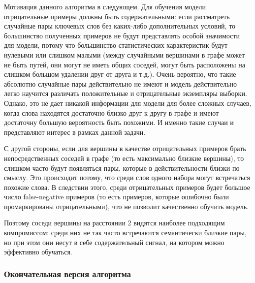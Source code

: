 Мотивация данного алгоритма в следующем. Для обучения модели отрицательные примеры должны быть содержательными: если рассматреть случайные пары ключевых слов без каких-либо дополнительных условий, то большинство полученных примеров не будут представлять особой значимости для модели, потому что большинство статистических характеристик будут нулевыми или слишком малыми (между случайными вершинами в графе может не быть путей, они могут не иметь общих соседей, могут быть расположены на слишком большом удалении друг от друга и т.д.). Очень вероятно, что такие абсолютно случайные пары действительно не имеют и модель действительно легко научится различать положительные и отрицательные экземпляры выборки. Однако,  это не дает никакой информации для модели для более сложных случаев, когда слова находятся достаточно близко друг к другу в графе и имеют достаточну большую вероятность быть похожими. И именно такие случаи и представляют интерес в рамках данной задачи.

С другой стороны, если для вершины в качестве отрицательных примеров брать непосредственных соседей в графе (то есть максимально близкие вершины), то слишком часто будут появляться пары, которые в действительности близки по смыслу. Это происходит потому, что среди слов одного набора могут встречаться похожие слова. В следствии этого, среди отрицательных примеров будет большое число false-negative примеров (то есть примеров, которые ошибочно были промаркированы отрицательными), что не позволит качественно обучить модель.

Поэтому соседи вершины на расстоянии $2$ видятся наиболее подходящим компромиссом: среди них не так часто встречаются семантически близкие пары, но при этом они несут в себе содержательный сигнал, на котором можно эффективно обучаться.
\subsubsection{Окончательная версия алгоритма}


